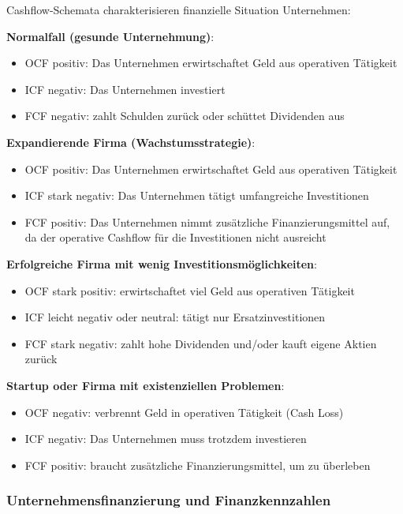 \begin{concept}{Cashflow-Schemata} charakterisieren finanzielle Situation Unternehmen:

\textbf{Normalfall (gesunde Unternehmung)}: 
    \begin{itemize}
        \item OCF positiv: Das Unternehmen erwirtschaftet Geld aus operativen Tätigkeit
        \item ICF negativ: Das Unternehmen investiert
        \item FCF negativ: zahlt Schulden zurück oder schüttet Dividenden aus
    \end{itemize}
\textbf{Expandierende Firma (Wachstumsstrategie)}:
    \begin{itemize}
        \item OCF positiv: Das Unternehmen erwirtschaftet Geld aus operativen Tätigkeit
        \item ICF stark negativ: Das Unternehmen tätigt umfangreiche Investitionen
        \item FCF positiv: Das Unternehmen nimmt zusätzliche Finanzierungsmittel auf, da der operative Cashflow für die Investitionen nicht ausreicht
    \end{itemize}
\textbf{Erfolgreiche Firma mit wenig Investitionsmöglichkeiten}:
    \begin{itemize}
        \item OCF stark positiv: erwirtschaftet viel Geld aus operativen Tätigkeit
        \item ICF leicht negativ oder neutral: tätigt nur Ersatzinvestitionen
        \item FCF stark negativ: zahlt hohe Dividenden und/oder kauft eigene Aktien zurück
    \end{itemize}
\textbf{Startup oder Firma mit existenziellen Problemen}:
    \begin{itemize}
        \item OCF negativ: verbrennt Geld in operativen Tätigkeit (Cash Loss)
        \item ICF negativ: Das Unternehmen muss trotzdem investieren
        \item FCF positiv: braucht zusätzliche Finanzierungsmittel, um zu überleben
    \end{itemize}
\end{concept}

\subsubsection{Unternehmensfinanzierung und Finanzkennzahlen}

